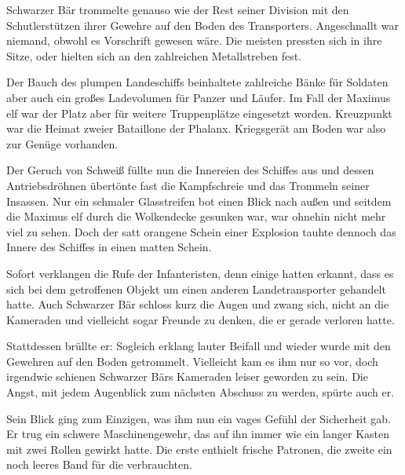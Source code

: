 Schwarzer Bär trommelte genauso wie der Rest seiner Division mit den Schutlerstützen ihrer Gewehre auf den Boden des Transporters. Angeschnallt war niemand, obwohl es Vorschrift gewesen wäre. Die meisten pressten sich in ihre Sitze, oder hielten sich an den zahlreichen Metallstreben fest.

\par

Der Bauch des plumpen Landeschiffs beinhaltete zahlreiche Bänke für Soldaten aber auch ein großes Ladevolumen für Panzer und Läufer. Im Fall der Maximus elf war der Platz aber für weitere Truppenplätze eingesetzt worden. Kreuzpunkt war die Heimat zweier Bataillone der Phalanx. Kriegsgerät am Boden war also zur Genüge vorhanden.

\par

Der Geruch von Schweiß füllte nun die Innereien des Schiffes aus und dessen Antriebsdröhnen übertönte fast die Kampfschreie und das Trommeln seiner Insassen. Nur ein schmaler Glasstreifen bot einen Blick nach außen und seitdem die Maximus elf durch die Wolkendecke gesunken war, war ohnehin nicht mehr viel zu sehen. Doch der satt orangene Schein einer Explosion tauhte dennoch das Innere des Schiffes in einen matten Schein.

\par

Sofort verklangen die Rufe der Infanteristen, denn einige hatten erkannt, dass es sich bei dem getroffenen Objekt um einen anderen Landetransporter gehandelt hatte. Auch Schwarzer Bär schloss kurz die Augen und zwang sich, nicht an die Kameraden und vielleicht sogar Freunde zu denken, die er gerade verloren hatte.

\par

Stattdessen brüllte er:  Sogleich erklang lauter Beifall und wieder wurde mit den Gewehren auf den Boden getrommelt. Vielleicht kam es ihm nur so vor, doch irgendwie schienen Schwarzer Bärs Kameraden leiser geworden zu sein. Die Angst, mit jedem Augenblick zum nächsten Abschuss zu werden, spürte auch er.

\par

Sein Blick ging zum Einzigen, was ihm nun ein vages Gefühl der Sicherheit gab. Er trug ein schwere Maschinengewehr, das auf ihn immer wie ein langer Kasten mit zwei Rollen gewirkt hatte. Die erste enthielt frische Patronen, die zweite ein noch leeres Band für die verbrauchten.

